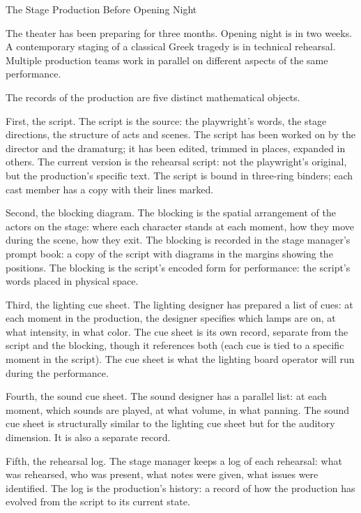 \begin{coda}{The Stage Production Before Opening Night}

The theater has been preparing for three months. Opening night is
in two weeks. A contemporary staging of a classical Greek tragedy
is in technical rehearsal. Multiple production teams work in
parallel on different aspects of the same performance.

The records of the production are five distinct mathematical objects.

First, the script. The script is the source: the playwright's words,
the stage directions, the structure of acts and scenes. The script
has been worked on by the director and the dramaturg; it has been
edited, trimmed in places, expanded in others. The current version
is the rehearsal script: not the playwright's original, but the
production's specific text. The script is bound in three-ring
binders; each cast member has a copy with their lines marked.

Second, the blocking diagram. The blocking is the spatial
arrangement of the actors on the stage: where each character
stands at each moment, how they move during the scene, how they
exit. The blocking is recorded in the stage manager's prompt
book: a copy of the script with diagrams in the margins showing
the positions. The blocking is the script's encoded form for
performance: the script's words placed in physical space.

Third, the lighting cue sheet. The lighting designer has
prepared a list of cues: at each moment in the production, the
designer specifies which lamps are on, at what intensity, in what
color. The cue sheet is its own record, separate from the
script and the blocking, though it references both (each cue is
tied to a specific moment in the script). The cue sheet is what
the lighting board operator will run during the performance.

Fourth, the sound cue sheet. The sound designer has a parallel
list: at each moment, which sounds are played, at what volume,
in what panning. The sound cue sheet is structurally similar to
the lighting cue sheet but for the auditory dimension. It is also
a separate record.

Fifth, the rehearsal log. The stage manager keeps a log of each
rehearsal: what was rehearsed, who was present, what notes were
given, what issues were identified. The log is the production's
history: a record of how the production has evolved from the
script to its current state.


\end{coda}
